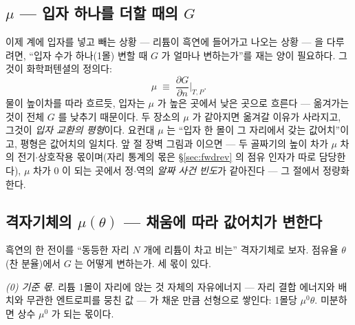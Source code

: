 \documentclass[11pt,a4paper]{article}
\begin{document}
\subsection{$\mu$ — 입자 하나를 더할 때의 $G$}
이제 계에 입자를 넣고 빼는 상황 — 리튬이 흑연에 들어가고 나오는 상황 — 을 다루려면, ``입자 수가 하나(1몰)
변할 때 $G$ 가 얼마나 변하는가''를 재는 양이 필요하다. 그것이 화학퍼텐셜의 정의다:
\begin{equation}
\mu\;\equiv\;\frac{\partial G}{\partial n}\Big|_{T,P}.
\label{eq:mudef}
\end{equation}
물이 높이차를 따라 흐르듯, 입자는 $\mu$ 가 높은 곳에서 낮은 곳으로 흐른다 — 옮겨가는 것이 전체 $G$ 를
낮추기 때문이다. 두 장소의 $\mu$ 가 같아지면 옮겨갈 이유가 사라지고, 그것이 \emph{입자 교환의 평형}이다.
요컨대 $\mu$ 는 ``입자 한 몰이 그 자리에서 갖는 값어치''이고, 평형은 값어치의 일치다. 앞 절 장벽 그림과
이으면 — 두 골짜기의 높이 차가 $\mu$ 차의 전기$\cdot$상호작용 몫이며(자리 통계의 몫은
\S\ref{sec:fwdrev} 의 점유 인자가 따로 담당한다), $\mu$ 차가 $0$ 이 되는 곳에서 정$\cdot$역의
\emph{알짜 사건 빈도}가 같아진다 — 그 절에서 정량화한다.

\subsection{격자기체의 $\mu(\theta)$ — 채움에 따라 값어치가 변한다}
흑연의 한 전이를 ``동등한 자리 $N$ 개에 리튬이 차고 비는'' 격자기체로 보자. 점유율 $\theta$(찬 분율)에서
$G$ 는 어떻게 변하는가. 세 몫이 있다.

\emph{(0) 기준 몫.} 리튬 1몰이 자리에 앉는 것 자체의 자유에너지 — 자리 결합 에너지와 배치와 무관한
엔트로피를 뭉친 값 — 가 채운 만큼 선형으로 쌓인다: 1몰당 $\mu^0\theta$. 미분하면 상수 $\mu^0$ 가
되는 몫이다.
\end{document}
